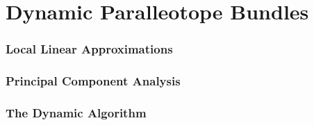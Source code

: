\chapter{Dynamic Paralleotope Bundles}

\subsection{Local Linear Approximations}
\label{sec:lin_app}

\subsection{Principal Component Analysis}
\label{sec:pca}

\subsection{The Dynamic Algorithm}
\label{sec:dyna_algo}
